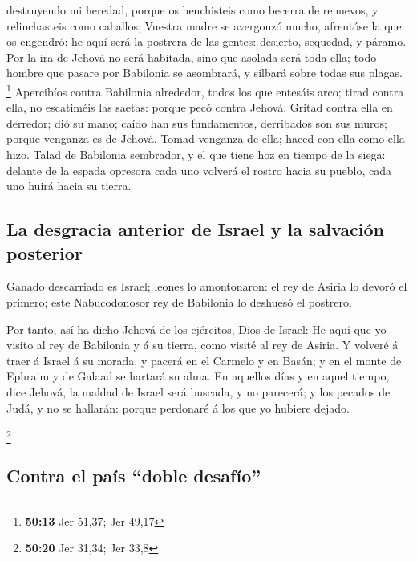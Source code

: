destruyendo mi heredad, porque os henchisteis como becerra de renuevos,
y relinchasteis como caballos;  Vuestra madre se
avergonzó mucho, afrentóse la que os engendró: he aquí será la postrera
de las gentes: desierto, sequedad, y páramo.  Por la ira
de Jehová no será habitada, sino que asolada será toda ella; todo hombre
que pasare por Babilonia se asombrará, y silbará sobre todas sus plagas.
\footnote{\textbf{50:13} Jer 51,37; Jer 49,17} 
Apercibíos contra Babilonia alrededor, todos los que entesáis arco;
tirad contra ella, no escatiméis las saetas: porque pecó contra Jehová.
 Gritad contra ella en derredor; dió su mano; caído han
sus fundamentos, derribados son sus muros; porque venganza es de Jehová.
Tomad venganza de ella; haced con ella como ella hizo. 
Talad de Babilonia sembrador, y el que tiene hoz en tiempo de la siega:
delante de la espada opresora cada uno volverá el rostro hacia su
pueblo, cada uno huirá hacia su tierra.

\hypertarget{la-desgracia-anterior-de-israel-y-la-salvaciuxf3n-posterior}{%
\subsection{La desgracia anterior de Israel y la salvación
posterior}\label{la-desgracia-anterior-de-israel-y-la-salvaciuxf3n-posterior}}

 Ganado descarriado es Israel; leones lo amontonaron: el
rey de Asiria lo devoró el primero; este Nabucodonosor rey de Babilonia
lo deshuesó el postrero.

 Por tanto, así ha dicho Jehová de los ejércitos, Dios de
Israel: He aquí que yo visito al rey de Babilonia y á su tierra, como
visité al rey de Asiria.  Y volveré á traer á Israel á su
morada, y pacerá en el Carmelo y en Basán; y en el monte de Ephraim y de
Galaad se hartará su alma.  En aquellos días y en aquel
tiempo, dice Jehová, la maldad de Israel será buscada, y no parecerá; y
los pecados de Judá, y no se hallarán: porque perdonaré á los que yo
hubiere dejado.

\footnote{\textbf{50:20} Jer 31,34; Jer 33,8}

\hypertarget{contra-el-pauxeds-doble-desafuxedo}{%
\subsection{Contra el país ``doble
desafío''}\label{contra-el-pauxeds-doble-desafuxedo}}

